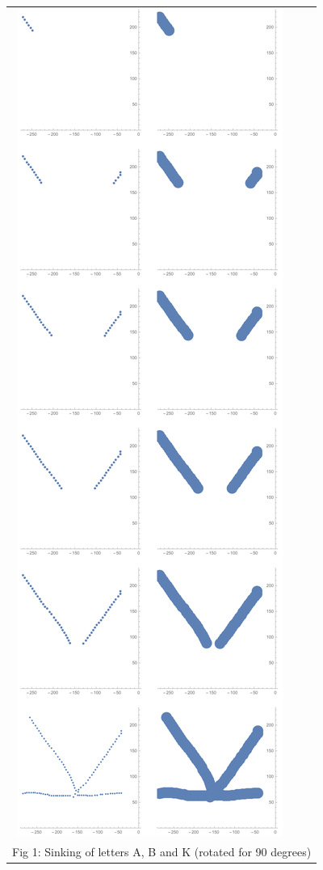 \documentclass{article}
\begin{document}
\begin{tabular}{c c c}
	\includegraphics[scale=0.2]{../images/RT-K-90-cuts.pdf}\\
      
	\multicolumn{3}{c}{Fig 1: Sinking of letters A, B and K (rotated for 90 degrees)}
\end{tabular}
\end{document}
